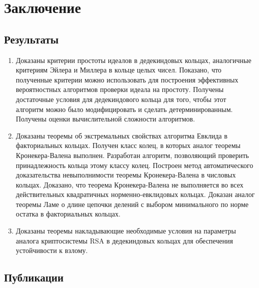 \documentclass[8pt, xcolor=x11names]{beamer}
\begin{document}
\section{Заключение}

\subsection{Результаты}

\begin{frame}
    \begin{enumerate}
        \item Доказаны критерии простоты идеалов в дедекиндовых кольцах, аналогичные критериям Эйлера и Миллера в кольце целых чисел.
        Показано, что полученные критерии можно использовать для построения эффективных вероятностных алгоритмов проверки идеала на простоту.
        Получены достаточные условия для дедекиндового кольца для того, чтобы этот алгоритм можно было модифицировать и сделать детерминированным.
        Получены оценки вычислительной сложности алгоритмов.
    
        \item Доказаны теоремы об экстремальных свойствах алгоритма Евклида в факториальных кольцах.
        Получен класс колец, в которых аналог теоремы Кронекера-Валена выполнен.
        Разработан алгоритм, позволяющий проверить принадлежность кольца этому классу колец.
        Построен метод автоматического доказательства невыполнимости теоремы Кронекера-Валена в числовых кольцах.
        Доказано, что теорема Кронекера-Валена не выполняется во всех действительных квадратичных норменно-евклидовых кольцах.
        Доказан аналог теоремы Ламе о длине цепочки делений с выбором минимального по норме остатка в факториальных кольцах.

        \item Доказаны теоремы накладывающие необходимые условия на параметры аналога криптосистемы RSA в дедекиндовых кольцах для обеспечения устойчивости к взлому.
    \end{enumerate}
\end{frame}

\subsection{Публикации}
\end{document}
